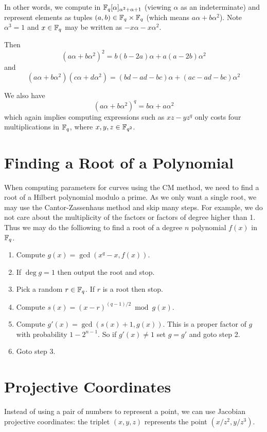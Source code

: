 In other words, we compute in $\mathbb{F}_q[\alpha]_{\alpha^2+\alpha+1}$
(viewing $\alpha$ as an indeterminate) and represent elements
as tuples $(a,b) \in \mathbb{F}_q \times \mathbb{F}_q$ (which means $a \alpha + b \alpha^2$).
Note $\alpha^3 = 1$ and $x\in\mathbb{F}_q$ may be written as $-x \alpha - x\alpha^2$.

Then
\[ (a \alpha + b \alpha^2)^2 = b(b-2a)\alpha + a(a-2b)\alpha^2 \]
and
\[ (a \alpha + b \alpha^2)(c \alpha + d \alpha^2) =
(bd-ad-bc)\alpha + (ac-ad-bc)\alpha^2 \]

We also have
\[ (a\alpha + b\alpha^2)^q = b\alpha + a\alpha^2 \]
which again implies computing expressions such as $x z - y z^q$ only
costs four multiplications in $\mathbb{F}_q$, where $x,y,z \in \mathbb{F}_{q^2}$.

\section{ \label{sec:rootfinding} Finding a Root of a Polynomial}

When computing parameters for curves using the CM method, we
need to find a root of a Hilbert polynomial modulo a prime.
As we only want a single root, we may use the Cantor-Zassenhaus
method and skip many steps. For example, we do not care about
the multiplicity of the factors or factors of degree higher than 1.
Thus we may do the folliowing to find a root of a
degree $n$ polynomial $f(x)$ in
$\mathbb{F}_q$.

\begin{enumerate}
\item
Compute $g(x) = \gcd(x^q - x, f(x))$.
\item
If $\deg g = 1$ then output the root and stop.
\item
Pick a random $r \in \mathbb{F}_q$. If $r$ is a root then stop.
\item
Compute $s(x) = (x-r)^{(q-1)/2} \bmod g(x)$.
\item
Compute $g'(x) = \gcd(s(x)+1, g(x))$. This is a proper factor of $g$
with probability $1 - 2^{n-1}$. So if $g'(x) \ne 1$ set $g = g'$ and
goto step 2.
\item
Goto step 3.
\end{enumerate}

\section {Projective Coordinates}

Instead of using a pair of numbers to represent a point,
we can use Jacobian projective coordinates: the triplet
$(x,y,z)$ represents the point $(x/z^2, y/z^3)$.

